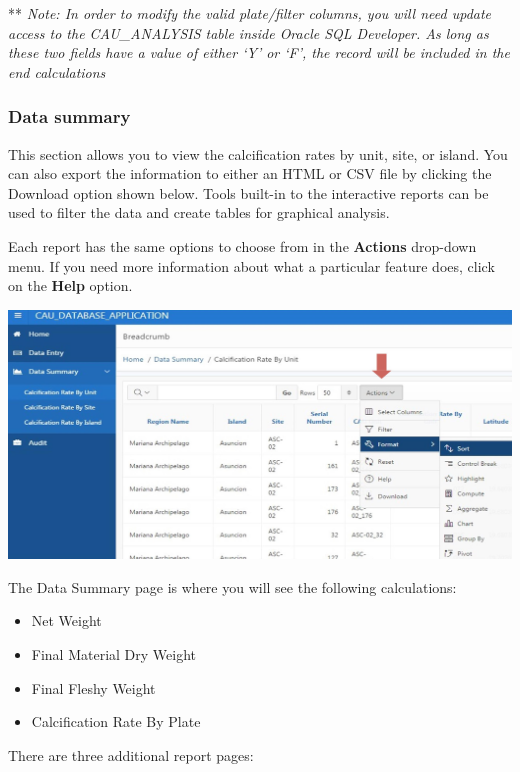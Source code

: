 \documentclass[]{book}
\providecommand{\tightlist}{%
  \setlength{\itemsep}{0pt}\setlength{\parskip}{0pt}}
\begin{document}
** \emph{Note: In order to modify the valid plate/filter columns, you will need update access to the CAU\_ANALYSIS table inside Oracle SQL Developer. As long as these two fields have a value of either `Y' or `F', the record will be included in the end calculations}

\hypertarget{data-summary}{%
\subsubsection{Data summary}\label{data-summary}}

This section allows you to view the calcification rates by unit, site, or island. You can also export the information to either an HTML or CSV file by clicking the Download option shown below. Tools built-in to the interactive reports can be used to filter the data and create tables for graphical analysis.

Each report has the same options to choose from in the \textbf{Actions} drop-down menu. If you need more information about what a particular feature does, click on the \textbf{Help} option.

\includegraphics{images/Data7.jpg}

The Data Summary page is where you will see the following calculations:

\begin{itemize}
\tightlist
\item
  Net Weight\\
\item
  Final Material Dry Weight\\
\item
  Final Fleshy Weight\\
\item
  Calcification Rate By Plate
\end{itemize}

There are three additional report pages:
\end{document}

